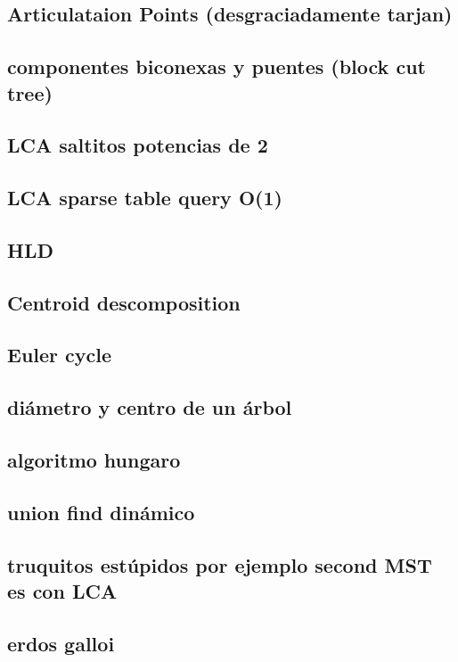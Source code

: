 \subsection{Articulataion Points (desgraciadamente tarjan)}
\subsection{componentes biconexas y puentes (block cut tree)}

\subsection{ LCA saltitos potencias de 2}
\subsection{LCA sparse table query O(1)}
\subsection{HLD}
\subsection{Centroid descomposition}
\subsection{Euler cycle}
\subsection{diámetro y centro de un árbol}
\subsection{algoritmo hungaro}
\subsection{union find dinámico}
\subsection{truquitos estúpidos por ejemplo second MST es con LCA }
\subsection{erdos galloi}

